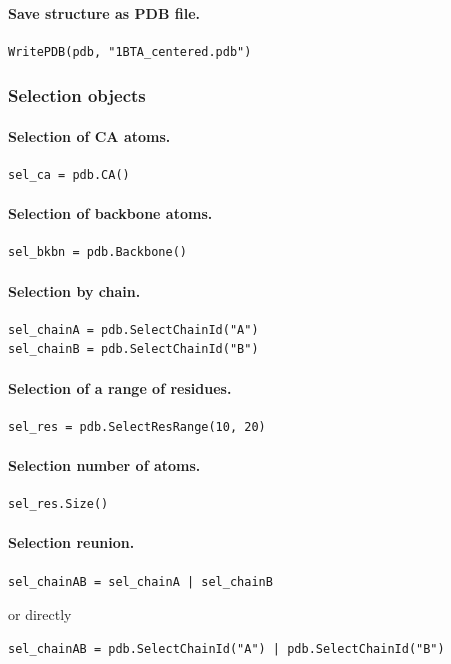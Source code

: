\documentclass[12pt,a4paper]{article}
\begin{document}
\paragraph{Save structure as PDB file.}
\begin{verbatim}
WritePDB(pdb, "1BTA_centered.pdb")
\end{verbatim}


\subsubsection{Selection objects}

\paragraph{Selection of CA atoms.}
\begin{verbatim}
sel_ca = pdb.CA()
\end{verbatim}


\paragraph{Selection of backbone atoms.}
\begin{verbatim}
sel_bkbn = pdb.Backbone()
\end{verbatim}


\paragraph{Selection by chain.}
\begin{verbatim}
sel_chainA = pdb.SelectChainId("A")
sel_chainB = pdb.SelectChainId("B")
\end{verbatim}


\paragraph{Selection of a range of residues.}
\begin{verbatim}
sel_res = pdb.SelectResRange(10, 20)
\end{verbatim}


\paragraph{Selection number of atoms.}
\begin{verbatim}
sel_res.Size()
\end{verbatim}



\paragraph{Selection reunion.}
\begin{verbatim}
sel_chainAB = sel_chainA | sel_chainB
\end{verbatim}
or directly
\begin{verbatim}
sel_chainAB = pdb.SelectChainId("A") | pdb.SelectChainId("B")
\end{verbatim}
\end{document}
